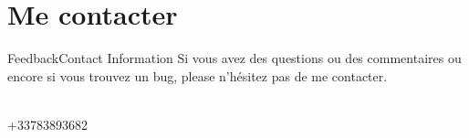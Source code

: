 \documentclass[10pt]{beamer}
\begin{document}
\section{Me contacter}
\begin{frame}{Feedback}{Contact Information}
Si vous avez des questions ou des commentaires ou encore si vous trouvez un bug, please n'hésitez pas de me contacter.
  \begin{center}
    \insertauthor\\
    +33783893682
  \end{center}
\end{frame}

{\aauwavesbg%
\begin{frame}%
\end{frame}}
\end{document}
